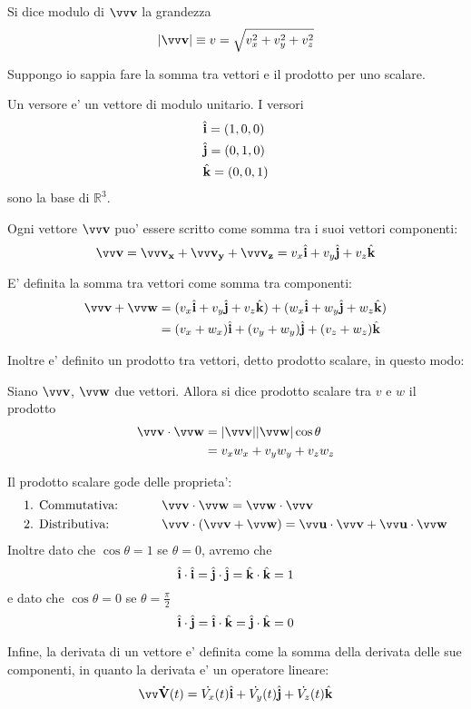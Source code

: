 \theoremstyle{definition}
\begin{definition}
    Si dice modulo di $\bvv{v}$ la grandezza \[\vmag{v} \equiv v = \sqrt{v_x^2 + v_y^2 + v_z^2}\]
\end{definition}
Suppongo io sappia fare la somma tra vettori e il prodotto per uno scalare.

\begin{definition}
    Un versore e' un vettore di modulo unitario. I versori 
    \begin{alignat*}{1}
        &\hat{\mathbf{i}} = (1, 0, 0) \\
        &\hat{\mathbf{j}} = (0, 1, 0) \\
        &\hat{\mathbf{k}} = (0, 0, 1)
    \end{alignat*}
     sono la base di
    $\mathbb{R}^3$.
\end{definition}

Ogni vettore $\bvv{v}$ puo' essere scritto come somma tra i suoi vettori componenti:
\[ \bvv{v} = \bvv{v_x} + \bvv{v_y} + \bvv{v_z} = v_x\bh{i} + v_y\bh{j} + v_z\bh{k} \]

E' definita la somma tra vettori come somma tra componenti:
\begin{alignat*}
    {1}
    \bvv{v} + \bvv{w} &= (v_x\bh{i} + v_y\bh{j} + v_z\bh{k}) + (w_x\bh{i} + w_y\bh{j} + w_z\bh{k}) \\
                      &= (v_x + w_x)\bh{i} + (v_y + w_y)\bh{j} + (v_z + w_z)\bh{k}
\end{alignat*}

Inoltre e' definito un prodotto tra vettori, detto prodotto scalare, in questo modo:
\begin{definition}
    Siano $\bvv{v}$, $\bvv{w}$ due vettori. Allora si dice prodotto scalare tra $v$ e $w$ il prodotto
    \begin{alignat*}
        {1}
        \bvv{v} \cdot \bvv{w} &= \vmag{v}\vmag{w}\cos{\theta}\\
                              &= v_xw_x + v_yw_y + v_zw_z
    \end{alignat*}
    
\end{definition}
Il prodotto scalare gode delle proprieta':
\begin{alignat*}
    {2}
    &\text{1. Commutativa: } \qquad&&\bvv{v} \cdot \bvv{w} = \bvv{w} \cdot \bvv{v} \\
    &\text{2. Distributiva:} \qquad&&\bvv{v} \cdot (\bvv{v} + \bvv{w}) = \bvv{u} \cdot \bvv{v} + \bvv{u} \cdot \bvv{w}
\end{alignat*}
Inoltre dato che $\cos{\theta} = 1$ se $\theta = 0$, avremo che
\[\hat{\mathbf{i}} \cdot \hat{\mathbf{i}} = \hat{\mathbf{j}} \cdot \hat{\mathbf{j}} = \hat{\mathbf{k}} \cdot \hat{\mathbf{k}} = 1\]
e dato che $\cos{\theta} = 0$ se $\theta = \frac{\pi}{2}$
\[\hat{\mathbf{i}} \cdot \hat{\mathbf{j}} = \hat{\mathbf{i}} \cdot \hat{\mathbf{k}} = \hat{\mathbf{j}} \cdot \hat{\mathbf{k}} = 0\]

Infine, la derivata di un vettore e' definita come la somma della derivata delle sue componenti, in quanto la derivata
e' un operatore lineare:
\[ \bvv{\dot{V}}(t) = \dot{V_x}(t)\bh{i} + \dot{V_y}(t)\bh{j} + \dot{V_z}(t)\bh{k} \]

